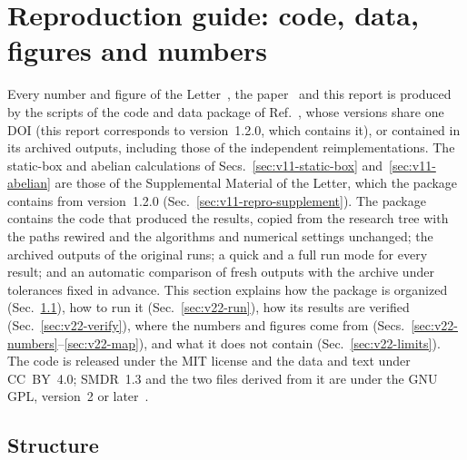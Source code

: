 
\section{Reproduction guide: code, data, figures and numbers}\label{rep:v-repro}

Every number and figure of the Letter~\cite{v12PRL}, the paper~\cite{v12PRD} and this report is produced by the scripts of the code and data package of Ref.~\cite{DNECv12code}, whose versions share one DOI (this report corresponds to version~1.2.0, which contains it), or contained in its archived outputs, including those of the independent reimplementations.
The static-box and abelian calculations of Secs.~\ref{sec:v11-static-box} and~\ref{sec:v11-abelian} are those of the Supplemental Material of the Letter, which the package contains from version~1.2.0 (Sec.~\ref{sec:v11-repro-supplement}).
The package contains the code that produced the results, copied from the research tree with the paths rewired and the algorithms and numerical settings unchanged; the archived outputs of the original runs; a quick and a full run mode for every result; and an automatic comparison of fresh outputs with the archive under tolerances fixed in advance.
This section explains how the package is organized (Sec.~\ref{sec:v22-structure}), how to run it (Sec.~\ref{sec:v22-run}), how its results are verified (Sec.~\ref{sec:v22-verify}), where the numbers and figures come from (Secs.~\ref{sec:v22-numbers}--\ref{sec:v22-map}), and what it does not contain (Sec.~\ref{sec:v22-limits}).
The code is released under the MIT license and the data and text under CC~BY~4.0; SMDR~1.3 and the two files derived from it are under the GNU GPL, version~2 or later~\cite{Martin:2019lqd}.

\subsection{Structure}\label{sec:v22-structure}

